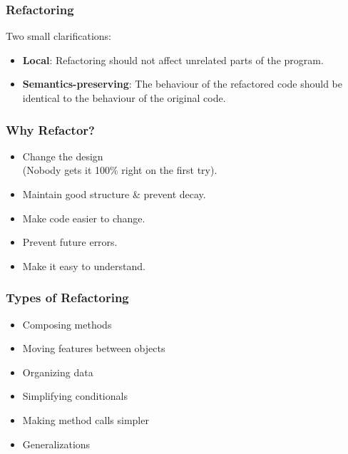 \begin{frame}
\frametitle{Refactoring}
\begin{changemargin}{1cm}

Two small clarifications:

\begin{itemize}
\item {\bf Local}: Refactoring should not affect unrelated parts of the
program. 
\item {\bf Semantics-preserving}: The behaviour
of the refactored code should be identical to the behaviour of the
original code. 
\end{itemize}

\end{changemargin}
\end{frame}


\begin{frame}
\frametitle{Why Refactor?}
\begin{changemargin}{1cm}

\begin{itemize}
	\item Change the design\\
	 \quad(Nobody gets it 100\% right on the first try).
	\item Maintain good structure \& prevent decay.
	\item Make code easier to change.
	\item Prevent future errors.
	\item Make it easy to understand.
\end{itemize}

\end{changemargin}
\end{frame}

\begin{frame}
\frametitle{Types of Refactoring}
\begin{changemargin}{1cm}
\begin{itemize}
	\item Composing methods
	\item Moving features between objects
	\item Organizing data
	\item Simplifying conditionals
	\item Making method calls simpler
	\item Generalizations
\end{itemize}

\end{changemargin}
\end{frame}


